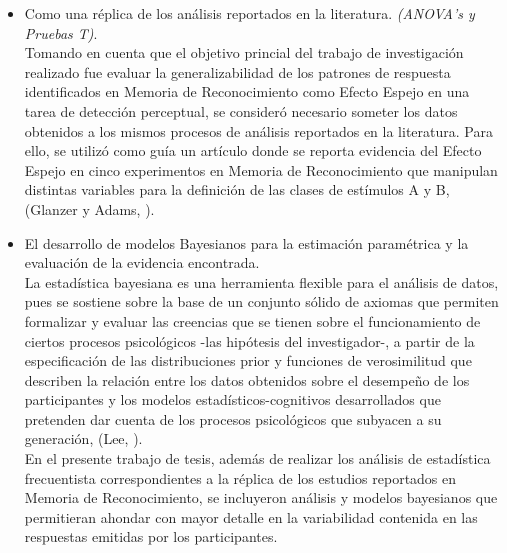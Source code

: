 \begin{itemize}
\item Como una réplica de los análisis reportados en la literatura. \textit{(ANOVA's y Pruebas T)}.\\

Tomando en cuenta que el objetivo princial del trabajo de investigación realizado fue evaluar la generalizabilidad de los patrones de respuesta identificados en Memoria de Reconocimiento como Efecto Espejo en una tarea de detección perceptual, se consideró necesario someter los datos obtenidos a los mismos procesos de análisis reportados en la literatura. Para ello, se utilizó como guía un artículo donde se reporta evidencia del Efecto Espejo en cinco experimentos en Memoria de Reconocimiento que manipulan distintas variables para la definición de las clases de estímulos A y B, (Glanzer y Adams, \citeyear{Glanzer1990}).\\

\item El desarrollo de modelos Bayesianos para la estimación paramétrica y la evaluación de la evidencia encontrada.\\

La estadística bayesiana es una herramienta flexible para el análisis de datos, pues se sostiene sobre la base de un conjunto sólido de axiomas que permiten formalizar y evaluar las creencias que se tienen sobre el funcionamiento de ciertos procesos psicológicos -las hipótesis del investigador-, a partir de la especificación de las distribuciones prior y funciones de verosimilitud que describen la relación entre los datos obtenidos sobre el desempeño de los participantes y los modelos estadísticos-cognitivos desarrollados que pretenden dar cuenta de los procesos psicológicos que subyacen a su generación, (Lee, \citeyear{Lee2011}).\\

En el presente trabajo de tesis, además de realizar los análisis de estadística frecuentista correspondientes a la réplica de los estudios reportados en Memoria de Reconocimiento, se incluyeron análisis y modelos bayesianos que permitieran ahondar con mayor detalle en la variabilidad contenida en las respuestas emitidas por los participantes.\\
\end{itemize}










